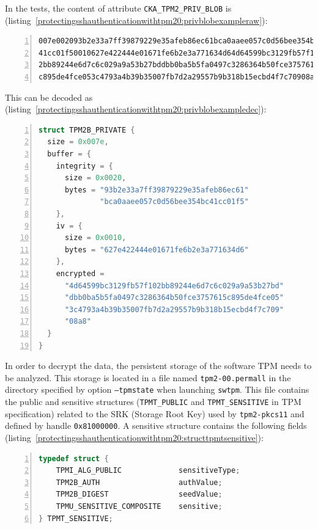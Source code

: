 In the tests, the content of attribute
\texttt{CKA\_TPM2\_PRIV\_BLOB} is
(listing~\ref{protectingsshauthenticationwithtpm20:privblobexampleraw}):

\begin{lstlisting}[numbers=left, caption={Example of generated private key blob}, label=protectingsshauthenticationwithtpm20:privblobexampleraw]
007e002093b2e33a7ff39879229e35afeb86ec61bca0aaee057c0d56bee354bc
41cc01f50010627e422444e01671fe6b2e3a771634d64d64599bc3129fb57f10
2bb89244e6d7c6c029a9a53b27bddbb0ba5b5fa0497c3286364b50fce3757615
c895de4fce053c4793a4b39b35007fb7d2a29557b9b318b15ecbd4f7c70908a8
\end{lstlisting}

This can be decoded as
(listing~\ref{protectingsshauthenticationwithtpm20:privblobexampledec}):

\begin{lstlisting}[language=C, numbers=left, caption={Deserialization of an example of generated private key blob}, label=protectingsshauthenticationwithtpm20:privblobexampledec]
struct TPM2B_PRIVATE {
  size = 0x007e,
  buffer = {
    integrity = {
      size = 0x0020,
      bytes = "93b2e33a7ff39879229e35afeb86ec61"
              "bca0aaee057c0d56bee354bc41cc01f5"
    },
    iv = {
      size = 0x0010,
      bytes = "627e422444e01671fe6b2e3a771634d6"
    },
    encrypted =
      "4d64599bc3129fb57f102bb89244e6d7c6c029a9a53b27bd"
      "dbb0ba5b5fa0497c3286364b50fce3757615c895de4fce05"
      "3c4793a4b39b35007fb7d2a29557b9b318b15ecbd4f7c709"
      "08a8"
  }
}
\end{lstlisting}

In order to decrypt the data, the persistent storage of the software TPM
needs to be analyzed. This storage is located in a file named
\texttt{tpm2-00.permall} in the directory specified by
option \texttt{--tpmstate} when launching
\texttt{swtpm}. This file contains the public and
sensitive structures (\texttt{TPMT\_PUBLIC} and
\texttt{TPMT\_SENSITIVE} in TPM specification) related
to the SRK (Storage Root Key) used by
\texttt{tpm2-pkcs11} and defined by handle
\texttt{0x81000000}. A sensitive structure contains the
following fields
(listing~\ref{protectingsshauthenticationwithtpm20:structtpmtsensitive}):

\begin{lstlisting}[language=C, numbers=left, caption={Structure \texttt{TPMT\_SENSITIVE} from TPM 2.0 specification}, label=protectingsshauthenticationwithtpm20:structtpmtsensitive]
typedef struct {
    TPMI_ALG_PUBLIC             sensitiveType;
    TPM2B_AUTH                  authValue;
    TPM2B_DIGEST                seedValue;
    TPMU_SENSITIVE_COMPOSITE    sensitive;
} TPMT_SENSITIVE;
\end{lstlisting}

